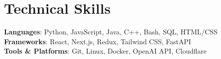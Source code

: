 \documentclass[letterpaper,11pt]{article}
\begin{document}
\section{Technical Skills}
\begin{itemize}[leftmargin=0.15in, label={}]
  \small{\item{
        \textbf{Languages}{: Python, JavaScript, Java, C++, Bash, SQL, HTML/CSS
        } \\
        \textbf{Frameworks}{: React, Next.js, Redux, Tailwind CSS, FastAPI} \\
        \textbf{Tools \& Platforms}{: Git, Linux, Docker, OpenAI API, Cloudflare} \\
        }}
\end{itemize}

\end{document}
